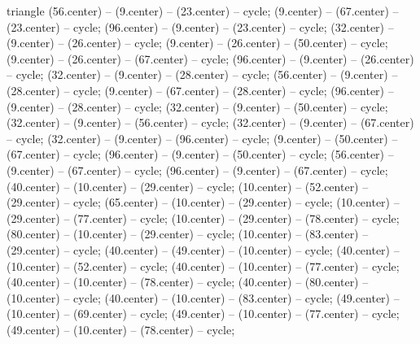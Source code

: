 \begin{pgfonlayer}{triangle}
 (56.center) -- (9.center) -- (23.center) -- cycle; 
 (9.center) -- (67.center) -- (23.center) -- cycle; 
 (96.center) -- (9.center) -- (23.center) -- cycle; 
 (32.center) -- (9.center) -- (26.center) -- cycle; 
 (9.center) -- (26.center) -- (50.center) -- cycle; 
 (9.center) -- (26.center) -- (67.center) -- cycle; 
 (96.center) -- (9.center) -- (26.center) -- cycle; 
 (32.center) -- (9.center) -- (28.center) -- cycle; 
 (56.center) -- (9.center) -- (28.center) -- cycle; 
 (9.center) -- (67.center) -- (28.center) -- cycle; 
 (96.center) -- (9.center) -- (28.center) -- cycle; 
 (32.center) -- (9.center) -- (50.center) -- cycle; 
 (32.center) -- (9.center) -- (56.center) -- cycle; 
 (32.center) -- (9.center) -- (67.center) -- cycle; 
 (32.center) -- (9.center) -- (96.center) -- cycle; 
 (9.center) -- (50.center) -- (67.center) -- cycle; 
 (96.center) -- (9.center) -- (50.center) -- cycle; 
 (56.center) -- (9.center) -- (67.center) -- cycle; 
 (96.center) -- (9.center) -- (67.center) -- cycle; 
 (40.center) -- (10.center) -- (29.center) -- cycle; 
 (10.center) -- (52.center) -- (29.center) -- cycle; 
 (65.center) -- (10.center) -- (29.center) -- cycle; 
 (10.center) -- (29.center) -- (77.center) -- cycle; 
 (10.center) -- (29.center) -- (78.center) -- cycle; 
 (80.center) -- (10.center) -- (29.center) -- cycle; 
 (10.center) -- (83.center) -- (29.center) -- cycle; 
 (40.center) -- (49.center) -- (10.center) -- cycle; 
 (40.center) -- (10.center) -- (52.center) -- cycle; 
 (40.center) -- (10.center) -- (77.center) -- cycle; 
 (40.center) -- (10.center) -- (78.center) -- cycle; 
 (40.center) -- (80.center) -- (10.center) -- cycle; 
 (40.center) -- (10.center) -- (83.center) -- cycle; 
 (49.center) -- (10.center) -- (69.center) -- cycle; 
 (49.center) -- (10.center) -- (77.center) -- cycle; 
 (49.center) -- (10.center) -- (78.center) -- cycle; 

\end{pgfonlayer}

